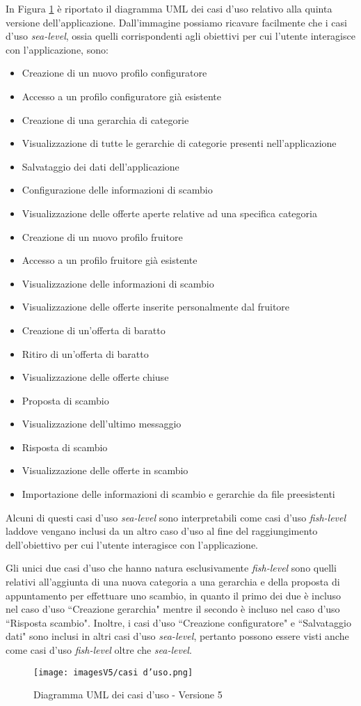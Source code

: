 In Figura \ref{fig:Use Case 5} è riportato il diagramma UML dei casi d'uso relativo alla quinta versione dell'applicazione. Dall'immagine possiamo ricavare facilmente che i casi d'uso \textit{sea-level}, ossia quelli corrispondenti agli obiettivi per cui l'utente interagisce con l'applicazione, sono:
\begin{itemize}
    \item Creazione di un nuovo profilo configuratore 
    \item Accesso a un profilo configuratore già esistente
    \item Creazione di una gerarchia di categorie
    \item Visualizzazione di tutte le gerarchie di categorie presenti nell'applicazione
    \item Salvataggio dei dati dell'applicazione
    \item Configurazione delle informazioni di scambio
    \item Visualizzazione delle offerte aperte relative ad una specifica categoria
    \item Creazione di un nuovo profilo fruitore
    \item Accesso a un profilo fruitore già esistente
    \item Visualizzazione delle informazioni di scambio
    \item Visualizzazione delle offerte inserite personalmente dal fruitore
    \item Creazione di un'offerta di baratto
    \item Ritiro di un'offerta di baratto  
    \item Visualizzazione delle offerte chiuse
    \item Proposta di scambio
    \item Visualizzazione dell'ultimo messaggio
    \item Risposta di scambio
    \item Visualizzazione delle offerte in scambio
    \item Importazione delle informazioni di scambio e gerarchie da file preesistenti
\end{itemize}
Alcuni di questi casi d'uso \textit{sea-level} sono interpretabili come casi d'uso \textit{fish-level} laddove vengano inclusi da un altro caso d'uso al fine del raggiungimento dell'obiettivo per cui l'utente interagisce con l'applicazione.

Gli unici due casi d'uso che hanno natura esclusivamente \textit{fish-level} sono quelli relativi all'aggiunta di una nuova categoria a una gerarchia e della proposta di appuntamento per effettuare uno scambio, in quanto il primo dei due è incluso nel caso d'uso ``Creazione gerarchia" mentre il secondo è incluso nel caso d'uso ``Risposta scambio". Inoltre, i casi d'uso ``Creazione configuratore" e ``Salvataggio dati" sono inclusi in altri casi d'uso \textit{sea-level}, pertanto possono essere visti anche come casi d'uso \textit{fish-level} oltre che \textit{sea-level}.

\begin{figure}[ht]
\centering
\texttt{[image: imagesV5/casi d'uso.png]}
\caption{\label{fig:Use Case 5}Diagramma UML dei casi d'uso - Versione 5}
\end{figure}\bigskip

